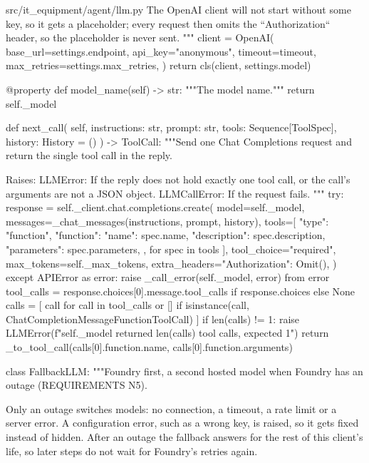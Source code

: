 \documentclass[11pt,letterpaper]{article}
\renewcommand{\_}{\textunderscore\allowbreak}
\begin{document}
\begin{codebox}{src/it_equipment/agent/llm.py}
        The OpenAI client will not start without some key, so it gets a placeholder; every
        request then omits the ``Authorization`` header, so the placeholder is never sent.
        """
        client = OpenAI(
            base_url=settings.endpoint,
            api_key="anonymous",
            timeout=timeout,
            max_retries=settings.max_retries,
        )
        return cls(client, settings.model)

    @property
    def model_name(self) -> str:
        """The model name."""
        return self._model

    def next_call(
        self, instructions: str, prompt: str, tools: Sequence[ToolSpec], history: History = ()
    ) -> ToolCall:
        """Send one Chat Completions request and return the single tool call in the reply.

        Raises:
            LLMError: If the reply does not hold exactly one tool call, or the call's
                arguments are not a JSON object.
            LLMCallError: If the request fails.
        """
        try:
            response = self._client.chat.completions.create(
                model=self._model,
                messages=_chat_messages(instructions, prompt, history),
                tools=[
                    {
                        "type": "function",
                        "function": {
                            "name": spec.name,
                            "description": spec.description,
                            "parameters": spec.parameters,
                        },
                    }
                    for spec in tools
                ],
                tool_choice="required",
                max_tokens=self._max_tokens,
                extra_headers={"Authorization": Omit()},
            )
        except APIError as error:
            raise _call_error(self._model, error) from error
        tool_calls = response.choices[0].message.tool_calls if response.choices else None
        calls = [
            call
            for call in tool_calls or []
            if isinstance(call, ChatCompletionMessageFunctionToolCall)
        ]
        if len(calls) != 1:
            raise LLMError(f"{self._model} returned {len(calls)} tool calls, expected 1")
        return _to_tool_call(calls[0].function.name, calls[0].function.arguments)


class FallbackLLM:
    """Foundry first, a second hosted model when Foundry has an outage (REQUIREMENTS N5).

    Only an outage switches models: no connection, a timeout, a rate limit or a server error.
    A configuration error, such as a wrong key, is raised, so it gets fixed instead of hidden.
    After an outage the fallback answers for the rest of this client's life, so later steps do
    not wait for Foundry's retries again.


\end{codebox}
\end{document}
